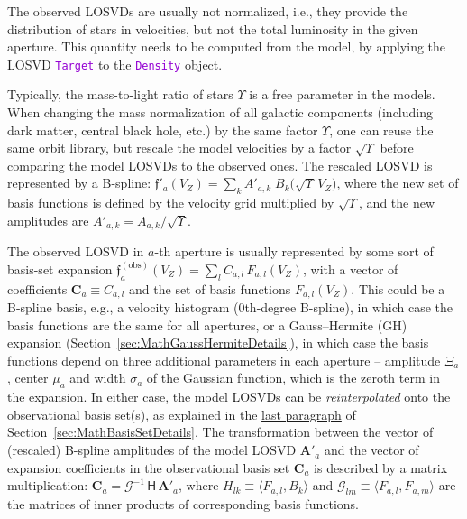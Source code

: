 \documentclass[12pt]{article}
\newcommand{\ttt}[1]{\textcolor{darkviolet}{\texttt{#1}}}
\begin{document}
The observed LOSVDs are usually not normalized, i.e., they provide the distribution of stars in velocities, but not the total luminosity in the given aperture. This quantity needs to be computed from the model, by applying the LOSVD \ttt{Target} to the \ttt{Density} object.

Typically, the mass-to-light ratio of stars $\Upsilon$ is a free parameter in the models. When changing the mass normalization of all galactic components (including dark matter, central black hole, etc.) by the same factor $\Upsilon$, one can reuse the same orbit library, but rescale the model velocities by a factor $\sqrt\Upsilon$ before comparing the model LOSVDs to the observed ones. The rescaled LOSVD is represented by a B-spline: 
$\mathfrak{f}'_a(V_Z) = \sum_k A'_{a,k}\;B_k\big(\sqrt\Upsilon\,V_Z\big)$, where the new set of basis functions is defined by the velocity grid multiplied by $\sqrt\Upsilon$, and the new amplitudes are $A'_{a,k} = A_{a,k}/\sqrt\Upsilon$.

The observed LOSVD in $a$-th aperture is usually represented by some sort of basis-set expansion 
$\mathfrak{f}^\mathrm{(obs)}_a(V_Z) = \sum_l C_{a,l}\,F_{a,l}(V_Z)$, with a vector of coefficients $\boldsymbol C_a \equiv C_{a,l}$ and the set of basis functions $F_{a,l}(V_Z)$. This could be a B-spline basis, e.g., a velocity histogram (0th-degree B-spline), in which case the basis functions are the same for all apertures, or a Gauss--Hermite (GH) expansion (Section~\ref{sec:MathGaussHermiteDetails}), in which case the basis functions depend on three additional parameters in each aperture -- amplitude $\Xi_a$, center $\mu_a$ and width $\sigma_a$ of the Gaussian function, which is the zeroth term in the expansion. In either case, the model LOSVDs can be \textit{reinterpolated} onto the observational basis set(s), as explained in the \hyperref[sec:MathBasisSetChange]{last paragraph} of Section~\ref{sec:MathBasisSetDetails}. The transformation between the vector of (rescaled) B-spline amplitudes of the model LOSVD $\boldsymbol A'_a$ and the vector of expansion coefficients in the observational basis set $\boldsymbol C_a$ is described by a matrix multiplication: $\boldsymbol C_a = \mathcal G^{-1}\,\mathsf H\, \boldsymbol A'_a$, where $H_{lk} \equiv \langle F_{a,l}, B_k \rangle$ and $\mathcal G_{lm} \equiv \langle F_{a,l}, F_{a,m} \rangle$ are the matrices of inner products of corresponding basis functions.
\end{document}
